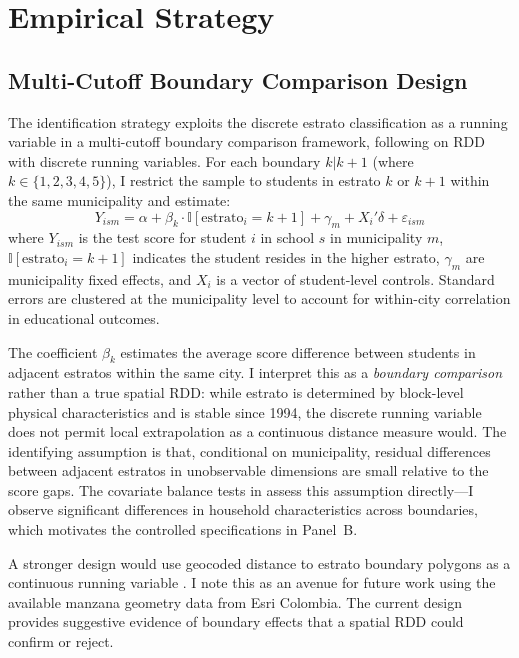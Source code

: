 \documentclass[12pt]{article}
\newcommand{\ind}{\mathbb{I}}
\begin{document}
\section{Empirical Strategy}

\subsection{Multi-Cutoff Boundary Comparison Design}

The identification strategy exploits the discrete estrato classification as a running variable in a multi-cutoff boundary comparison framework, following \citet{lee2008randomized} on RDD with discrete running variables. For each boundary $k|k+1$ (where $k \in \{1,2,3,4,5\}$), I restrict the sample to students in estrato $k$ or $k+1$ within the same municipality and estimate:
\begin{equation}
\label{eq:main}
Y_{ism} = \alpha + \beta_k \cdot \ind[\text{estrato}_i = k+1] + \gamma_m + X_i'\delta + \varepsilon_{ism}
\end{equation}
where $Y_{ism}$ is the test score for student $i$ in school $s$ in municipality $m$, $\ind[\text{estrato}_i = k+1]$ indicates the student resides in the higher estrato, $\gamma_m$ are municipality fixed effects, and $X_i$ is a vector of student-level controls. Standard errors are clustered at the municipality level to account for within-city correlation in educational outcomes.

The coefficient $\beta_k$ estimates the average score difference between students in adjacent estratos within the same city. I interpret this as a \textit{boundary comparison} rather than a true spatial RDD: while estrato is determined by block-level physical characteristics and is stable since 1994, the discrete running variable does not permit local extrapolation as a continuous distance measure would. The identifying assumption is that, conditional on municipality, residual differences between adjacent estratos in unobservable dimensions are small relative to the score gaps. The covariate balance tests in  assess this assumption directly---I observe significant differences in household characteristics across boundaries, which motivates the controlled specifications in Panel~B.

A stronger design would use geocoded distance to estrato boundary polygons as a continuous running variable \citep{keele2015geographic}. I note this as an avenue for future work using the available manzana geometry data from Esri Colombia. The current design provides suggestive evidence of boundary effects that a spatial RDD could confirm or reject.
\end{document}
